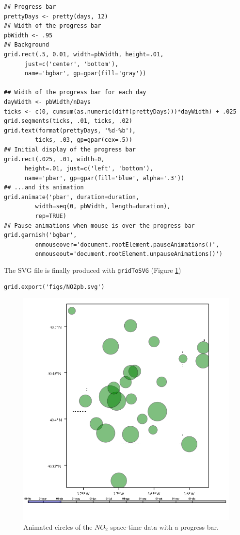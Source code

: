 \lstset{language=R,numbers=none}
\begin{lstlisting}
## Progress bar
prettyDays <- pretty(days, 12)
## Width of the progress bar
pbWidth <- .95
## Background
grid.rect(.5, 0.01, width=pbWidth, height=.01,
	  just=c('center', 'bottom'),
	  name='bgbar', gp=gpar(fill='gray'))

## Width of the progress bar for each day
dayWidth <- pbWidth/nDays
ticks <- c(0, cumsum(as.numeric(diff(prettyDays)))*dayWidth) + .025
grid.segments(ticks, .01, ticks, .02)
grid.text(format(prettyDays, '%d-%b'),
		 ticks, .03, gp=gpar(cex=.5))
## Initial display of the progress bar
grid.rect(.025, .01, width=0,
	  height=.01, just=c('left', 'bottom'),
	  name='pbar', gp=gpar(fill='blue', alpha='.3'))
## ...and its animation
grid.animate('pbar', duration=duration,
	     width=seq(0, pbWidth, length=duration),
	     rep=TRUE)
## Pause animations when mouse is over the progress bar
grid.garnish('bgbar',
	     onmouseover='document.rootElement.pauseAnimations()',
	     onmouseout='document.rootElement.unpauseAnimations()')
\end{lstlisting}

The SVG file is finally produced with \texttt{gridToSVG} (Figure \ref{fig:NO2pb})


\lstset{language=R,numbers=none}
\begin{lstlisting}
grid.export('figs/NO2pb.svg')
\end{lstlisting}

\begin{figure}
  \centering
  \includegraphics[width=\textwidth]{figs/NO2pb.png}
  \caption{Animated circles of the $NO_2$ space-time data with a progress bar.}
  \label{fig:NO2pb}
\end{figure}

